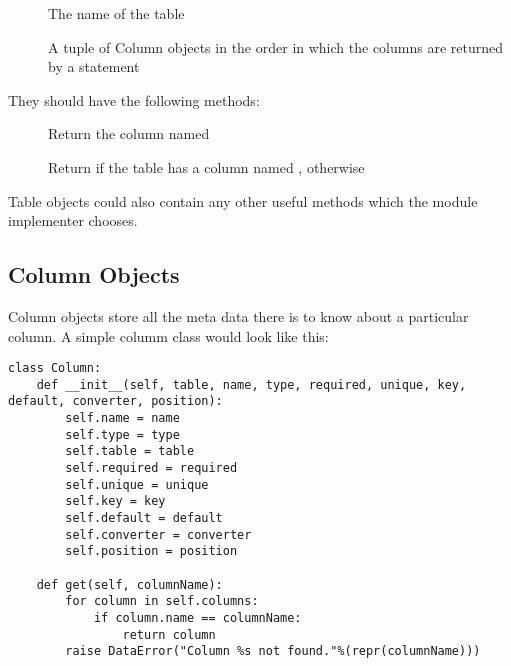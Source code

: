 \documentclass{howto}
\begin{document}
\begin{description}
\item[]      
The name of the table
\item[]      
A tuple of Column objects in the order in which the columns are returned by a  statement
\end{description}

They should have the following methods:

\begin{description}
\item[]      
Return the column named 
\item[]       
Return  if the table has a column named ,  otherwise
\end{description}

Table objects could also contain any other useful methods which the module implementer chooses.
    
\subsection{Column Objects}

Column objects store all the meta data there is to know about a particular column. A simple columm class would look like this:
\begin{verbatim}
class Column:
    def __init__(self, table, name, type, required, unique, key, default, converter, position):
        self.name = name
        self.type = type
        self.table = table
        self.required = required
        self.unique = unique
        self.key = key
        self.default = default
        self.converter = converter
        self.position = position

    def get(self, columnName):
        for column in self.columns:
            if column.name == columnName:
                return column
        raise DataError("Column %s not found."%(repr(columnName)))
\end{verbatim}
\end{document}
